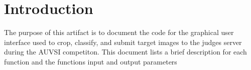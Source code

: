 \documentclass[]{article}
\newcounter{includepdfpage}
\newcommand{\pdflink}[2]{
\hyperlink{#1.1}{\textbf{#2}}
}
\newcommand{\pdflinkdoc}[2]{

}
\begin{document}



\section{Introduction}

The purpose of this artifact is to document the code for the graphical user interface used to crop, classify, and 
submit target images to the judges server during the AUVSI competiton. This document lists a brief description for 
each function and the functions input and output parameters 




\pdflinkdoc{api_doc}{./api/api.pdf}
\end{document}
